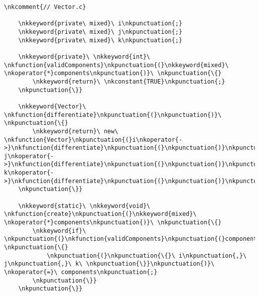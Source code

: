 \documentclass[openany]{memoir}
\begin{document}
\shaded
\begin{Verbatim}[commandchars=\\\{\}]
    \nkcomment{// Vector.c}

    \nkkeyword{private\ mixed}\ i\nkpunctuation{;}
    \nkkeyword{private\ mixed}\ j\nkpunctuation{;}
    \nkkeyword{private\ mixed}\ k\nkpunctuation{;}

    \nkkeyword{private}\ \nkkeyword{int}\ \nkfunction{validComponents}\nkpunctuation{(}\nkkeyword{mixed}\ \nkoperator{*}components\nkpunctuation{)}\ \nkpunctuation{\{}
        \nkkeyword{return}\ \nkconstant{TRUE}\nkpunctuation{;}
    \nkpunctuation{\}}

    \nkkeyword{Vector}\ \nkfunction{differentiate}\nkpunctuation{(}\nkpunctuation{)}\ \nkpunctuation{\{}
        \nkkeyword{return}\ new\ \nkfunction{Vector}\nkpunctuation{(}i\nkoperator{->}\nkfunction{differentiate}\nkpunctuation{(}\nkpunctuation{)}\nkpunctuation{,}\ j\nkoperator{->}\nkfunction{differentiate}\nkpunctuation{(}\nkpunctuation{)}\nkpunctuation{,}\ k\nkoperator{->}\nkfunction{differentiate}\nkpunctuation{(}\nkpunctuation{)}\nkpunctuation{)}\nkpunctuation{;}
    \nkpunctuation{\}}

    \nkkeyword{static}\ \nkkeyword{void}\ \nkfunction{create}\nkpunctuation{(}\nkkeyword{mixed}\ \nkoperator{*}components\nkpunctuation{)}\ \nkpunctuation{\{}
        \nkkeyword{if}\ \nkpunctuation{(}\nkfunction{validComponents}\nkpunctuation{(}components\nkpunctuation{)}\nkpunctuation{)}\ \nkpunctuation{\{}
            \nkpunctuation{(}\nkpunctuation{\{}\ i\nkpunctuation{,}\ j\nkpunctuation{,}\ k\ \nkpunctuation{\}}\nkpunctuation{)}\ \nkoperator{=}\ components\nkpunctuation{;}
        \nkpunctuation{\}}
    \nkpunctuation{\}}
\end{Verbatim}
\endshaded
\end{document}
